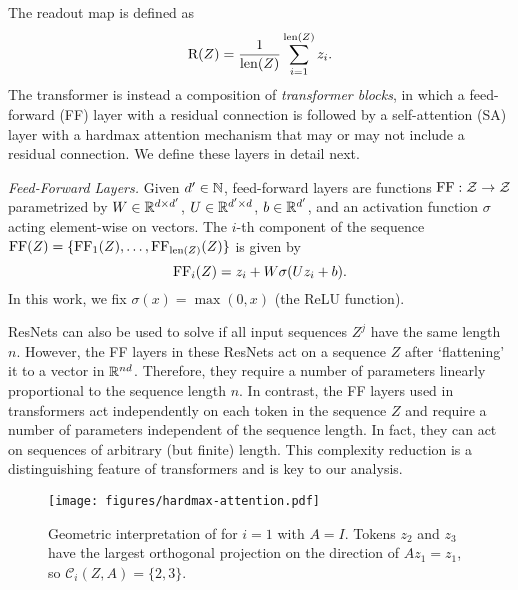 \documentclass[11pt,a4paper]{amsart}
\begin{document}
The readout map is defined as
\begin{equation}\label{eq:readout}
    \mathrm{R}(Z) = \frac{1}{\operatorname{len}(Z)} \sum_{i=1}^{\operatorname{len}(Z)} z_i.
\end{equation}
The transformer is instead a composition of \emph{transformer blocks}, in which a feed-forward (FF) layer with a residual connection is followed by a self-attention (SA) layer with a hardmax attention mechanism that may or may not include a residual connection. We define these layers in detail next.
\vspace{3mm}

\noindent\textit{Feed-Forward Layers.} Given $d'\in \mathbb{N}$, feed-forward layers are functions $\operatorname{\mathrm{FF}} : \mathcal{Z} \to \mathcal{Z}$ parametrized by $W \in \mathbb{R}^{d \times d'}$, $U \in \mathbb{R}^{d'\times d}$, $b\in \mathbb{R}^{d'}$, and an activation function $\sigma$ acting element-wise on vectors. The $i$-th component of the sequence $\operatorname{\mathrm{FF}}(Z)=\{\operatorname{\mathrm{FF}}_1(Z),\ldots,\operatorname{\mathrm{FF}}_{\operatorname{len}(Z)}(Z)\}$ is given by
\begin{equation}
\operatorname{\mathrm{FF}}_i(Z) = z_i + W\sigma(U z_i + b).
\end{equation}
In this work, we fix $\sigma(x) = \max (0,x)$ (the ReLU function).
\begin{remark}
    ResNets can also be used to solve  if all input sequences $Z^j$ have the same length $n$. However, the FF layers in these ResNets act on a sequence $Z$ after `flattening' it to a vector in $\mathbb{R}^{nd}$. Therefore, they require a number of parameters linearly proportional to the sequence length $n$. In contrast, the FF layers used in transformers act independently on each token in the sequence $Z$ and require a number of parameters independent of the sequence length. In fact, they can act on sequences of arbitrary (but finite) length. This complexity reduction is a distinguishing feature of transformers and is key to our analysis.
\end{remark}
\begin{figure}
    \centering
    \texttt{[image: figures/hardmax-attention.pdf]}
    \caption{Geometric interpretation of  for $i=1$ with $A=I$. Tokens $z_2$ and $z_3$ have the largest orthogonal projection on the direction of $Az_1 = z_1$, so $\mathcal{C}_i(Z,A) = \{ 2,3 \}$.}
    \label{fig:hm_att}
\end{figure}
\vspace{3mm}
\end{document}
